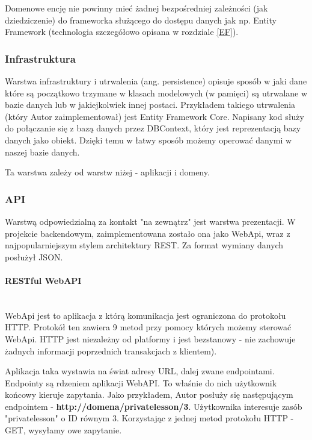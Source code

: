 \documentclass[12pt]{article}
\newcommand{\myparagraph}[1]{\paragraph{#1}\mbox{}\\}
\numberwithin{figure}{section}
\begin{document}
        Domenowe encję nie powinny mieć żadnej bezpośredniej zależności (jak dziedziczenie) do frameworka służącego do dostępu danych jak np. Entity Framework (technologia szczegółowo opisana w rozdziale \ref{EF}).
        
        \subsubsection{Infrastruktura}
        Warstwa infrastruktury i utrwalenia (ang. persistence) opisuje sposób w jaki dane które są początkowo trzymane w klasach modelowych (w pamięci) są utrwalane w bazie danych lub w jakiejkolwiek innej postaci. Przykładem takiego utrwalenia (który Autor zaimplementował) jest Entity Framework Core. Napisany kod służy do połączanie się z bazą danych przez DBContext, który jest reprezentacją bazy danych jako obiekt. Dzięki temu w łatwy sposób możemy operować danymi w naszej bazie danych.
        
        Ta warstwa zależy od warstw niżej - aplikacji i domeny.
        
        \subsubsection{API}
        Warstwą odpowiedzialną za kontakt "na zewnątrz" jest warstwa prezentacji. W projekcie backendowym, zaimplementowana zostało ona jako WebApi, wraz z najpopularniejszym stylem architektury REST. Za format wymiany danych posłużył JSON.
        
        \myparagraph{RESTful WebAPI}
        WebApi jest to aplikacja z którą komunikacja jest ograniczona do protokołu HTTP. Protokół ten zawiera 9 metod przy pomocy których możemy sterować WebApi. 
        HTTP jest niezależny od platformy i jest bezstanowy - nie zachowuje żadnych informacji poprzednich transakcjach z klientem). 
        
        Aplikacja taka wystawia na świat adresy URL, dalej zwane endpointami.
        Endpointy są rdzeniem aplikacji WebAPI. To właśnie do nich użytkownik końcowy kieruje zapytania. Jako przykładem, Autor posłuży się następującym endpointem - \textbf{http://domena/privatelesson/3}. Użytkownika interesuje zasób "privatelesson" o ID równym 3. Korzystając z jednej metod protokołu HTTP - GET, wysyłamy owe zapytanie.
        
\end{document}
